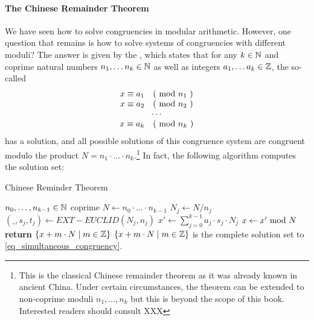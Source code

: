 \paragraph{The Chinese Remainder Theorem} We have seen how to solve congruencies in modular arithmetic. However, one question that remains is how to solve systems of congruencies with different moduli? The answer is given by the , which states that for any $ k \in \mathbb{N} $ and coprime natural numbers $ n_1, \ldots n_k \in \mathbb{N} $ as well as integers $ a_1, \ldots a_k \in \mathbb{Z} $, the so-called 
\begin{equation}
\label{eq_simultaneous_congruency}
\begin{array}{c}
x \equiv a_1 \quad \text{( mod } n_1 \text{ )} \\
x \equiv a_2 \quad \text{( mod } n_2 \text{ )} \\
\cdots \\
x \equiv a_k \quad \text{( mod } n_k \text{ )} \\
\end{array}
\end{equation}
has a solution, and all possible solutions of this congruence system are congruent modulo
the product $N= n_1 \cdot \ldots \cdot n_k $.\footnote{This is the classical Chinese remainder theorem as it was already known in ancient China. Under certain circumstances, the theorem can be extended to non-coprime moduli $ n_1, \ldots, n_k $ but this is beyond the scope of this book. Interested readers should consult XXX } In fact, the following algorithm computes the solution set: 
\begin{algorithm}\caption{Chinese Reminder Theorem}
\label{alg_ext_euclid_alg}
\begin{algorithmic}[0]
\Require $n_0,\ldots,n_{k-1} \in \mathbb{N}$ coprime
\State $N\gets n_0\cdot \ldots \cdot n_{k-1}$
\State $N_j\gets N/n_j$
\State $(\_,s_j,t_j)\gets EXT-EUCLID (N_j,n_j)$ 
\EndWhile
\State $x'\gets \sum_{j=0}^{k-1}a_j\cdot s_j\cdot N_j$
\State $x\gets x' \text{ mod } N$
\State \textbf{return} $\{x+ m\cdot N\;|\; m\in \mathbb{Z}\}$
\EndProcedure
\Ensure $\{x+ m\cdot N\;|\; m\in \mathbb{Z}\}$ is the complete solution set to \ref{eq_simultaneous_congruency}.
\end{algorithmic}
\end{algorithm}


